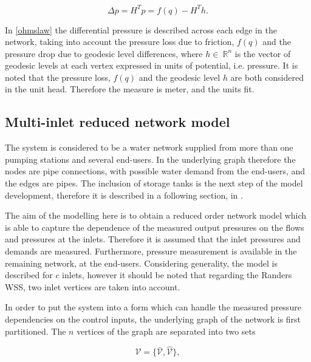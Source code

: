 \begin{equation}
  \label{ohmslaw}
  \Delta p = H^Tp = f(q) - H^Th.
\end{equation}

In \eqref{ohmslaw} the differential pressure is described across each edge in the network, taking into account the pressure loss due to friction, $f(q)$ and the pressure drop due to geodesic level differences,  where $h \in \: \mathbb{R}^{n}$ is the vector of geodesic levels at each vertex expressed in units of potential, i.e. pressure. It is noted that the pressure loss, $f(q)$ and the geodesic level $h$ are both considered in the unit head. Therefore the measure is meter, and the units fit. 


\subsection{Multi-inlet reduced network model}
\label{multi_inlet_reduced_network_description}

The system is considered to be a water network supplied from more than one pumping stations and several end-users. In the underlying graph therefore the nodes are pipe connections, with possible water demand from the end-users, and the edges are pipes. The inclusion of storage tanks is the next step of the model development, therefore it is described in a following section, in .

The aim of the modelling here is to obtain a reduced order network model which is able to capture the dependence of the measured output pressures on the flows and pressures at the inlets. Therefore it is assumed that the inlet pressures and demands are measured. Furthermore, pressure measurement is available in the remaining network, at the end-users. Considering generality, the model is described for $c$ inlets, however it should be noted that regarding the Randers WSS, two inlet vertices are taken into account. 

In order to put the system into a form which can handle the measured pressure dependencies on the control inputs, the underlying graph of the network is first partitioned. The $n$ vertices of the graph are separated into two sets

\begin{equation}
  \label{vertices1}
  \mathcal{V} = \{\bar{\mathcal{V}}, \hat{\mathcal{V}} \}, 
\end{equation}

